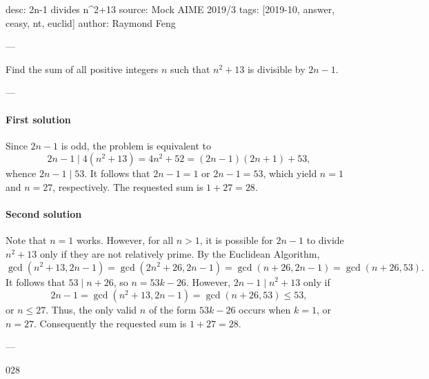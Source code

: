 desc: 2n-1 divides n^2+13
source: Mock AIME 2019/3
tags: [2019-10, answer, ceasy, nt, euclid]
author: Raymond Feng

---

Find the sum of all positive integers $n$ such that $n^2+13$ is divisible by $2n-1$.

---

\paragraph{First solution}     Since $2n-1$ is odd, the problem is equivalent to \[2n-1\mid 4(n^2+13)=4n^2+52=(2n-1)(2n+1)+53,\]
whence $2n-1\mid 53$. It follows that $2n-1=1$ or $2n-1=53$, which yield $n=1$ and $n=27$, respectively. The requested sum is $1+27=28$.

\paragraph{Second solution}     Note that $n=1$ works. However, for all $n>1$, it is possible for $2n-1$ to divide $n^2+13$ only if they are not relatively prime. By the Euclidean Algorithm, \[\gcd(n^2+13,2n-1)=\gcd(2n^2+26,2n-1)=\gcd(n+26,2n-1)=\gcd(n+26,53).\]
It follows that $53\mid n+26$, so $n=53k-26$. However, $2n-1\mid n^2+13$ only if \[2n-1=\gcd(n^2+13,2n-1)=\gcd(n+26,53)\le 53,\]
or $n\le 27$. Thus, the only valid $n$ of the form $53k-26$ occurs when $k=1$, or $n=27$. Consequently the requested sum is $1+27=28$.


---

028
